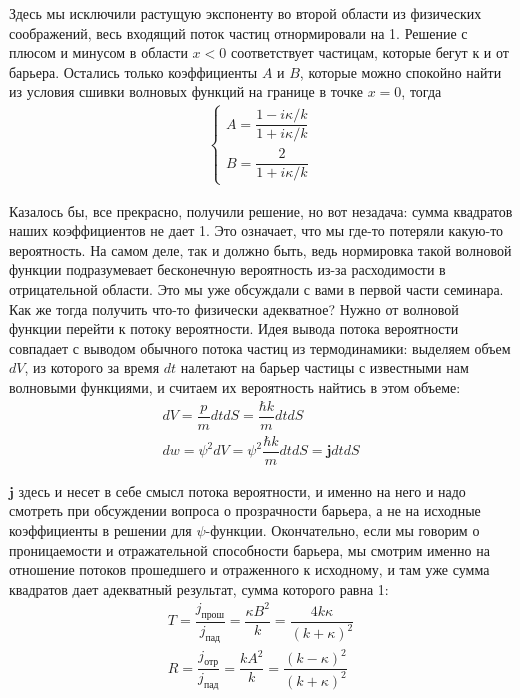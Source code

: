 \documentclass[12pt]{article}
\begin{document}
Здесь мы исключили растущую экспоненту во второй области из физических соображений, весь входящий поток частиц отнормировали на 1. Решение с плюсом и минусом в области $x<0$ соответствует частицам, которые бегут к и от барьера. Остались только коэффициенты $A$ и $B$, которые можно спокойно найти из условия сшивки волновых функций на границе в точке $x=0$, тогда 
\begin{gather*}
    \begin{cases}
        A = \dfrac{1 - i\kappa/k}{1 + i\kappa/k}\\[5pt]
        B = \dfrac{2}{1 + i\kappa/k}
    \end{cases}
\end{gather*}

Казалось бы, все прекрасно, получили решение, но вот незадача: сумма квадратов наших коэффициентов не дает 1. Это означает, что мы где-то потеряли какую-то вероятность. На самом деле, так и должно быть, ведь нормировка такой волновой функции подразумевает бесконечную вероятность из-за расходимости в отрицательной области. Это мы уже обсуждали с вами в первой части семинара. Как же тогда получить что-то физически адекватное? Нужно от волновой функции перейти к потоку вероятности. Идея вывода потока вероятности совпадает с выводом обычного потока частиц из термодинамики: выделяем объем $dV$, из которого за время $dt$ налетают на барьер частицы с известными нам волновыми функциями, и считаем их вероятность найтись в этом объеме:
\begin{gather*}
    dV = \dfrac{p}{m}dtdS = \dfrac{\hbar k}{m}dtdS\\
    dw = \psi^2dV = \psi^2\dfrac{\hbar k}{m}dtdS = \textbf{j}dtdS
\end{gather*}

$\textbf{j}$ здесь и несет в себе смысл потока вероятности,  и именно на него и надо смотреть при обсуждении вопроса о прозрачности барьера, а не на исходные коэффициенты в решении для $\psi$-функции. Окончательно, если мы говорим о проницаемости и отражательной способности барьера, мы смотрим именно на отношение потоков прошедшего и отраженного к исходному, и там уже сумма квадратов дает адекватный результат, сумма которого равна 1:
\begin{gather*}
    T = \dfrac{j_{\text{прош}}}{j_{\text{пад}}} = \dfrac{\kappa B^2}{k} = \dfrac{4k\kappa}{(k+\kappa)^2} \\
    R = \dfrac{j_{\text{отр}}}{j_{\text{пад}}} = \dfrac{k A^2}{k} = \dfrac{(k-\kappa)^2}{(k+\kappa)^2}
\end{gather*}
\end{document}
